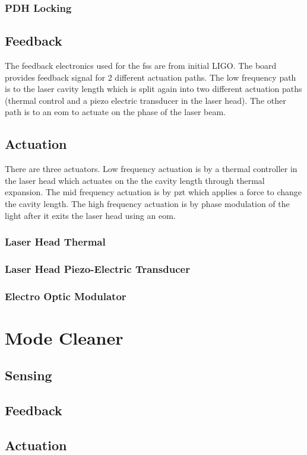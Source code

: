 \subsubsection{PDH Locking}

\subsection{Feedback}
The feedback electronics used for the \ac{fss} are from initial LIGO. The board
provides feedback signal for 2 different actuation paths. The low frequency path
is to the laser cavity length which is split again into two different actuation
paths (thermal control and a piezo electric transducer in the laser head). The
other path is to an \ac{eom} to actuate on the phase of the laser beam.

\subsection{Actuation}

There are three actuators. Low frequency actuation is by a thermal controller in
the laser head which actuates on the the cavity length through thermal expansion.
The mid frequency actuation is by \ac{pzt} which applies a force to change the
cavity length. The high frequency actuation is by phase modulation of the light
after it exits the laser head using an \ac{eom}.


\subsubsection{Laser Head Thermal}

\subsubsection{Laser Head Piezo-Electric Transducer}

\subsubsection{Electro Optic Modulator}

\section{Mode Cleaner}
\cite{Willke:98}


\subsection{Sensing}

\subsection{Feedback}

\subsection{Actuation}
